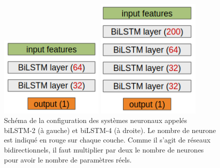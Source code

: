 \begin{figure}[thb]
  \centering
  \begin{minipage}[b]{0.49\linewidth}
      \center
      \centerline{\includegraphics[width=5cm]{./Chapitre5/figures/biLSTM2.png}}
  \end{minipage}
  \begin{minipage}[b]{0.49\linewidth}
      \center
      \centerline{\includegraphics[width=5cm]{./Chapitre5/figures/biLSTM4.png}}
  \end{minipage}
    \caption{Schéma de la configuration des systèmes neuronaux appelés biLSTM-2 (à gauche) et biLSTM-4 (à droite). Le nombre de neurone est indiqué en rouge sur chaque couche. Comme il s'agit de réseaux bidirectionnels, il faut multiplier par deux le nombre de neurones pour avoir le nombre de paramètres réels.}
    \label{fig:biLSTM}
\end{figure}
